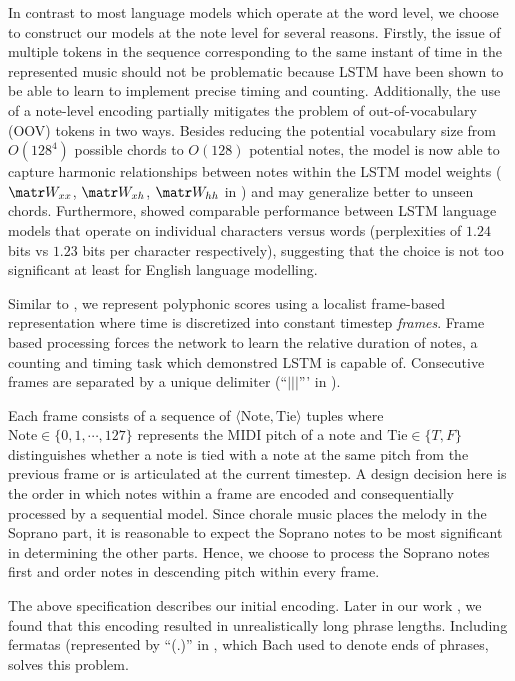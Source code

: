 In contrast to most language models which operate at the word level, we choose
to construct our models at the note level for several reasons.
Firstly, the issue of multiple tokens in the sequence corresponding to the same
instant of time in the represented music should not be problematic because
LSTM have been shown to be able to learn to implement precise timing and
counting\cite{gers2002learning}. Additionally, the use of a note-level encoding
partially mitigates the problem of out-of-vocabulary (OOV) tokens in two ways.
Besides reducing the potential vocabulary size from $O(128^4)$ possible chords
to $O(128)$ potential notes, the model is now able to capture harmonic
relationships between notes within the LSTM model weights ($\W_{xx}$,
$\W_{xh}$, $\W_{hh}$ in ) and may generalize better to unseen
chords. Furthermore, \citet{graves2013generating} showed comparable performance
between LSTM language models that operate on individual characters versus words
(perplexities of $1.24$ bits vs $1.23$ bits per character respectively),
suggesting that the choice is not too significant at least for English language
modelling.


Similar to \citep{todd1989connectionist}, we represent polyphonic scores using
a localist frame-based representation where time is discretized into constant
timestep \emph{frames}. Frame based processing forces the network to learn the
relative duration of notes, a counting and timing task which
\citep{gers2002learning} demonstred LSTM is capable of. Consecutive frames are
separated by a unique delimiter (``$|||$''' in ).

Each frame consists of a sequence of $\langle \text{Note}, \text{Tie} \rangle$
tuples where $\text{Note} \in \{0,1,\cdots,127\}$ represents the MIDI pitch of
a note and $\text{Tie} \in \{T,F\}$ distinguishes whether a note is tied with a
note at the same pitch from the previous frame or is articulated at the current
timestep. A design decision here is the order in which notes within a frame are
encoded and consequentially processed by a sequential model. Since chorale
music places the melody in the Soprano part, it is reasonable to expect the
Soprano notes to be most significant in determining the other parts. Hence, we
choose to process the Soprano notes first and order notes in descending pitch
within every frame.

The above specification describes our initial encoding. Later in our work
, we found that this encoding resulted in unrealistically long
phrase lengths. Including fermatas (represented by ``(.)'' in , which Bach used to denote ends of phrases, solves this problem.

